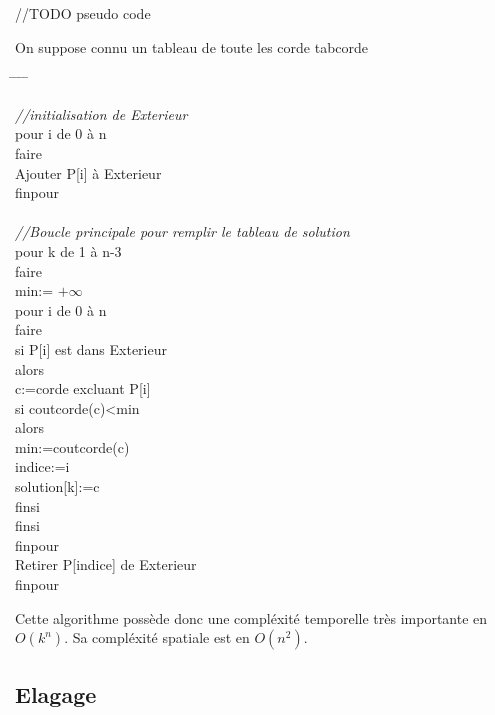 \documentclass[a4paper,10pt]{article}
\begin{document}
//TODO pseudo code

On suppose connu un tableau de toute les corde tabcorde

\begin{tabbing}
\hspace{0.5cm} \= \hspace{0.5cm}  \= \hspace{0.5cm} \= \hspace{0.5cm} \= \kill


\textit{//initialisation de Exterieur}\\
pour i de 0 à n\\
faire\\
\> Ajouter P[i] à Exterieur\\
finpour\\
\\
\textit{//Boucle principale pour remplir le tableau de solution}\\
pour k de 1 à n-3\\
faire\\
    \> min:= $+\infty$ \\ 
    \> pour i de 0 à n\\
    \> faire\\
        \> \> si P[i] est dans Exterieur\\
        \> \> alors\\
            \> \> \> c:=corde excluant P[i]\\
            \> \> \> si coutcorde(c)<min\\
            \> \> \> alors\\
                \> \> \> \> min:=coutcorde(c)\\
                \> \> \> \> indice:=i\\
                \> \> \> \> solution[k]:=c\\
            \> \> \> finsi\\
        \> \> finsi\\
    \> finpour\\
    \> Retirer P[indice] de Exterieur\\
finpour\\
\end{tabbing}

Cette algorithme possède donc une compléxité temporelle très importante en $O(k^n)$.
Sa compléxité spatiale est en $O(n^2)$.

\subsection{Elagage}
\end{document}
